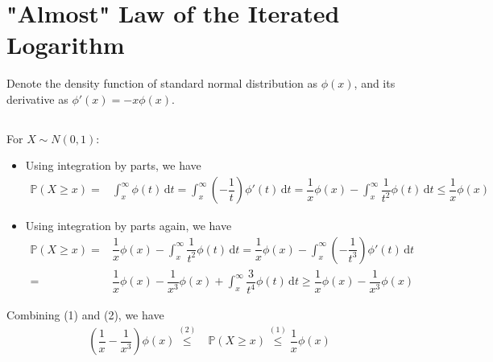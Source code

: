 \documentclass[11pt,a4paper]{article}
\numberwithin{equation}{section}%
\begin{document}
    









\section{"Almost" Law of the Iterated Logarithm}

Denote the density function of standard normal distribution as $ \phi(x) $, and its derivative as $ \phi'(x)=-x\phi(x) $.

\subsection{}
For $ X\sim N(0,1) $:
\begin{itemize}[topsep=2pt,itemsep=0pt]
    \item Using integration by parts, we have
    \begin{align*}
        \mathbb{P}\left( X\geq x \right) =& \int_x^\infty \phi(t)\,\mathrm{d}t = \int _x^\infty (-\dfrac{ 1 }{ t } ) \phi '(t) \,\mathrm{d}t = \dfrac{ 1 }{ x } \phi(x) - \int _x^\infty \dfrac{ 1 }{ t^2 } \phi (t ) \,\mathrm{d}t \leq  \dfrac{ 1 }{ x } \phi(x) \tag{1}
    \end{align*}
    \item Using integration by parts again, we have
    \begin{align*}
        \mathbb{P}\left( X\geq x \right) =&\dfrac{ 1 }{ x } \phi(x) - \int _x^\infty \dfrac{ 1 }{ t^2 } \phi (t ) \,\mathrm{d}t = \dfrac{ 1 }{ x } \phi(x) -\int _x^\infty (-\dfrac{ 1 }{ t^3 }) \phi' (t ) \,\mathrm{d}t \\=& \dfrac{ 1 }{ x } \phi(x) - \dfrac{ 1 }{ x^3 } \phi(x) + \int _x^\infty \dfrac{ 3 }{ t^4 } \phi (t ) \,\mathrm{d}t \geq  \dfrac{ 1 }{ x } \phi(x) - \dfrac{ 1 }{ x^3 } \phi(x) \tag{2}
    \end{align*}
\end{itemize}
Combining (1) and (2), we have
\begin{align*}
    \left(\dfrac{ 1 }{ x } - \dfrac{ 1 }{ x^3 }\right) \phi(x) \mathop{ \leq  }\limits^{(2)} & \mathbb{P}\left( X\geq x \right) \mathop{ \leq  }\limits^{(1)} \dfrac{ 1 }{ x } \phi(x) 
\end{align*}
\end{document}
